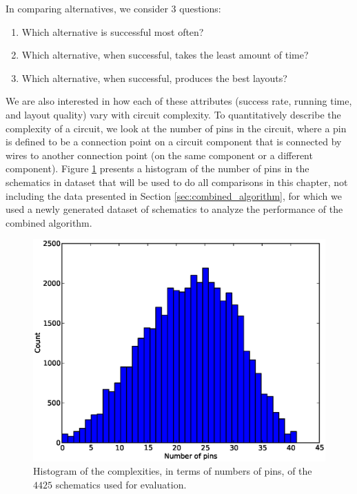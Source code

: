In comparing alternatives, we consider $3$ questions:
\begin{enumerate}
\item Which alternative is successful most often?
\item Which alternative, when successful, takes the least amount of time?
\item Which alternative, when successful, produces the best layouts?
\end{enumerate}

We are also interested in how each of these attributes (success rate, running
time, and layout quality) vary with circuit complexity. To quantitatively
describe the complexity of a circuit, we look at the number of pins in the
circuit, where a pin is defined to be a connection point on a circuit
component that is connected by wires to another connection point (on the same
component or a different component). Figure
\ref{fig:complexity_hist} presents a histogram of the number of pins in the
schematics in dataset that will be used to do all comparisons in this chapter,
not including the data presented in Section \ref{sec:combined_algorithm}, for
which we used a newly generated dataset of schematics to analyze the performance
of the combined algorithm.

\begin{figure}[H]
\begin{center}
\includegraphics[width=\textwidth]{Images/complexity_hist.eps}
\caption[Schematic complexity histogram]{Histogram of the complexities, in terms
of numbers of pins, of the $4425$ schematics used for evaluation.}
\label{fig:complexity_hist}
\end{center}
\end{figure}

